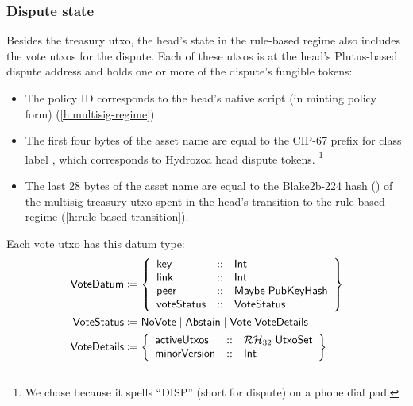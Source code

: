 \documentclass[../hydrozoa.tex]{subfiles}
\begin{document}
\subsubsection{Dispute state}

Besides the treasury utxo, the head's state in the rule-based regime also includes the vote utxos for the dispute.
Each of these utxos is at the head's Plutus-based dispute address and holds one or more of the dispute's fungible tokens:
\begin{itemize}
  \item The policy ID corresponds to the head's native script (in minting policy form) (\cref{h:multisig-regime}).
  \item The first four bytes of the asset name are equal to the CIP-67
    \citep{AlessandroKonradThomasVellekoopCIP67AssetName2022}
    prefix for class label , which corresponds to Hydrozoa head dispute tokens.%
    \footnote{We chose  because it spells ``DISP'' (short for dispute) on a phone dial pad.}
  \item The last 28 bytes of the asset name are equal to the Blake2b-224 hash () of the multisig treasury utxo spent in the head's transition to the rule-based regime (\cref{h:rule-based-transition}).
\end{itemize}

Each vote utxo has this datum type:
\begin{equation*}
\begin{split}
  \mathsf{VoteDatum} &\coloneq \left\{
    \begin{array}{lll}
      \mathsf{key}  &::& \mathsf{Int} \\
      \mathsf{link} &::& \mathsf{Int} \\
      \mathsf{peer} &::& \mathsf{Maybe} \; \mathsf{PubKeyHash} \\
      \mathsf{voteStatus} &::& \mathsf{VoteStatus}
    \end{array}\right\}\\
  \mathsf{VoteStatus} &\coloneq \mathsf{NoVote} \mid \mathsf{Abstain} \mid \mathsf{Vote} \; \mathsf{VoteDetails} \\
  \mathsf{VoteDetails} &\coloneq \left\{
    \begin{array}{lll}
      \mathsf{activeUtxos} &::& \mathcal{RH}_{32} \; \mathsf{UtxoSet} \\
      \mathsf{minorVersion} &::& \mathsf{Int}
    \end{array}\right\}
\end{split}
\end{equation*}
\end{document}
